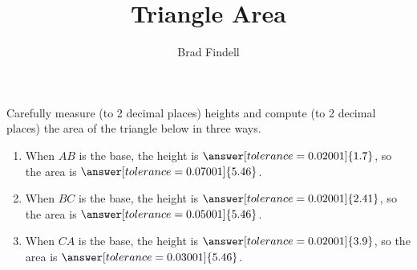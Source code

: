 \documentclass[nooutcomes]{ximera}
\title{Triangle Area}
\author{Brad Findell}
\begin{document}

\begin{problem}
Carefully measure (to 2 decimal places) heights and compute (to 2 decimal places) the area of the triangle below in three ways.  
\begin{center}  
\end{center}
\begin{enumerate}
\item When $AB$ is the base, the height is $\answer[tolerance=0.02001]{1.7}$, so the area is $\answer[tolerance=0.07001]{5.46}$.
\item When $BC$ is the base, the height is $\answer[tolerance=0.02001]{2.41}$, so the area is $\answer[tolerance=0.05001]{5.46}$.
\item When $CA$ is the base, the height is $\answer[tolerance=0.02001]{3.9}$, so the area is $\answer[tolerance=0.03001]{5.46}$.
\end{enumerate}
\end{problem}
\end{document}
